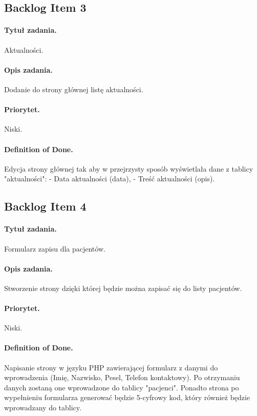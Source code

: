 \documentclass[a4paper]{article} \usepackage{polski} \usepackage[cp1250]{inputenc} \usepackage{url}
\begin{document}
\subsection{Backlog Item 3}\paragraph{Tytuł zadania.} Aktualności. \paragraph{Opis zadania.} Dodanie do strony głównej listę aktualności. \paragraph{Priorytet.} Niski. \paragraph{Definition of Done.}  Edycja strony głównej tak aby w przejrzysty sposób wyświetlała dane z tablicy "aktualności":
- Data aktualności (data),
- Treść aktualności (opis).

\subsection{Backlog Item 4}\paragraph{Tytuł zadania.} Formularz zapisu dla pacjentów. \paragraph{Opis zadania.} Stworzenie strony dzięki której będzie można zapisać się do listy pacjentów. \paragraph{Priorytet.} Niski. \paragraph{Definition of Done.} Napisanie strony w języku PHP zawierającej formularz z danymi do wprowadzenia (Imię, Nazwisko, Pesel, Telefon kontaktowy). Po otrzymaniu danych zostaną one wprowadzone do tablicy "pacjenci". Ponadto strona po wypełnieniu formularza generować będzie 5-cyfrowy kod, który również będzie wprowadzany do tablicy.
\end{document}
